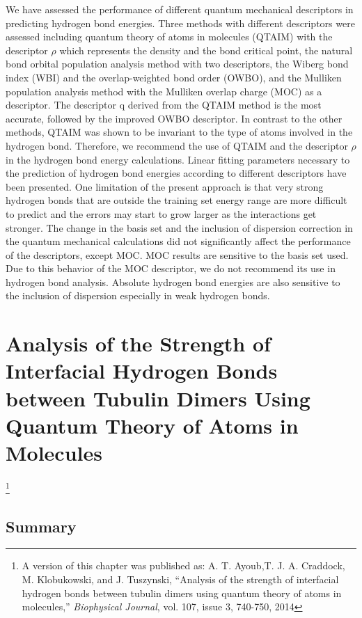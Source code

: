 \documentclass[11pt]{report}
\begin{document}
We have assessed the performance of different quantum mechanical descriptors in predicting hydrogen bond energies. Three methods with different descriptors were
assessed including quantum theory of atoms in molecules (QTAIM) with the descriptor $\rho$ which represents the density and the bond critical point, the natural bond orbital population analysis method with two descriptors, the Wiberg bond index (WBI) and the overlap-weighted bond order (OWBO), and the Mulliken population analysis method with the Mulliken overlap charge (MOC) as a descriptor. The descriptor q derived from the QTAIM method is the most accurate, followed by the improved OWBO descriptor. In contrast to the other methods, QTAIM was shown to be invariant to the type of atoms involved in the hydrogen bond. Therefore, we recommend the use of QTAIM and the descriptor $\rho$ in the hydrogen bond energy calculations. Linear fitting parameters necessary to the prediction of hydrogen bond energies according to different descriptors have been presented. One limitation of the present approach is that very strong hydrogen bonds that are outside the training set energy range are more difficult to predict and the errors may start to grow larger as the interactions get stronger. The change in the basis set and the inclusion of dispersion correction in the quantum mechanical calculations did not significantly affect the performance of the descriptors, except MOC. MOC results are sensitive to the basis set used. Due to this behavior of the MOC descriptor, we do not recommend its use in hydrogen bond analysis. Absolute hydrogen bond energies are also sensitive to the inclusion of dispersion especially in weak hydrogen bonds.


\chapter{Analysis of the Strength of Interfacial Hydrogen Bonds between Tubulin Dimers Using Quantum Theory of Atoms in Molecules}
\label{THB}

\footnote{A version of
this chapter was published as: A. T. Ayoub,T. J. A. Craddock, M. Klobukowski, and J. Tuszynski,
``Analysis of the strength of interfacial hydrogen bonds between tubulin dimers using quantum theory of atoms in molecules,''
\emph{Biophysical Journal}, vol. 107, issue 3, 740-750, 2014}

\section{Summary}
\end{document}
